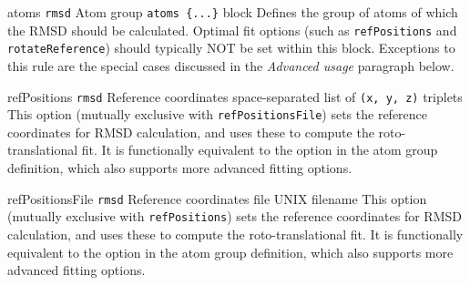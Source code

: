 \begin{cvcoptions}

\item %
  \key
    {atoms}{%
    \texttt{rmsd}}{%
    Atom group}{%
    \texttt{atoms~\{...\}} block}{%
    Defines the group of atoms of which the RMSD should be calculated.
    Optimal fit options (such as \texttt{refPositions} and
    \texttt{rotateReference}) should typically NOT be set within this
    block. Exceptions to this rule are the special cases discussed in
    the \emph{Advanced usage} paragraph below.
    }

\item %
  \key
    {refPositions}{%
    \texttt{rmsd}}{%
    Reference coordinates}{%
    space-separated list of \texttt{(x, y, z)} triplets}{%
    This option (mutually exclusive with \texttt{refPositionsFile}) sets the reference coordinates for RMSD calculation, and uses these to compute the roto-translational fit.
    It is functionally equivalent to the option  in the atom group definition, which also supports more advanced fitting options.
    }

\item %
  \key
    {refPositionsFile}{%
    \texttt{rmsd}}{%
    Reference coordinates file}{%
    UNIX filename}{%
    This option (mutually exclusive with \texttt{refPositions}) sets the reference coordinates for RMSD calculation, and uses these to compute the roto-translational fit.
    It is functionally equivalent to the option  in the atom group definition, which also supports more advanced fitting options.
    }



\end{cvcoptions}
